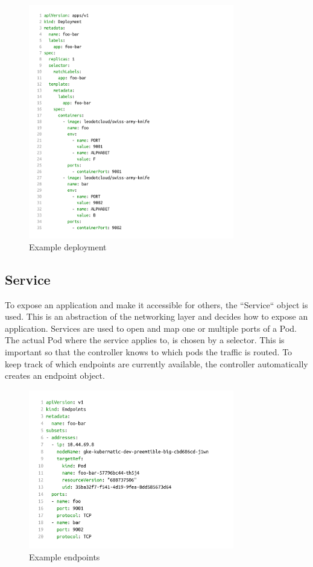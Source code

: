 \begin{figure}[H]
    \centering
    \includegraphics[width=0.8\textwidth, left]{media/02/deployment}
    \caption{Example deployment}
    \label{fig:deployment}
\end{figure}


\subsection{Service}\label{subsec:service}
To expose an application and make it accessible for others, the ``Service`` object is used.
This is an abstraction of the networking layer and decides how to expose an application.
Services are used to open and map one or multiple ports of a Pod.
The actual Pod where the service applies to, is chosen by a selector.
This is important so that the controller knows to which pods the traffic is routed.
To keep track of which endpoints are currently available, the controller automatically creates an endpoint object.

\begin{figure}[H]
    \centering
    \includegraphics[width=0.8\textwidth, left]{media/02/endpoint}
    \caption{Example endpoints}
    \label{fig:endpoints}
\end{figure}

